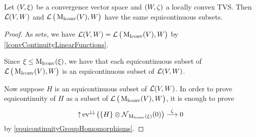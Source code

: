 \begin{proposition} \label{equicontinuousSetsLconvMod}
Let $\left( V,\xi \right)$ be a convergence vector space and $\left( W,\zeta \right)$ a locally convex TVS. Then $\operatorname{\mathcal{L}}(V,W)$ and $\operatorname{\mathcal{L}}\big(\operatorname{M_\text{lconv}}(V), W\big)$ have the same equicontinuous subsets.
\end{proposition}
\begin{proof}
As sets, we have $\operatorname{\mathcal{L}}(V,W) = \operatorname{\mathcal{L}}\big(\operatorname{M_\text{lconv}}(V), W\big)$ by \ref{lconvContinuityLinearFunctions}.

Since $\xi \leq \operatorname{M_\text{lconv}}(\xi)$, we have that each equicontinuous subset of $\operatorname{\mathcal{L}}\big(\operatorname{M_\text{lconv}}(V), W\big)$ is an equicontinuous subset of $\operatorname{\mathcal{L}}(V,W)$.

Now suppose $H$ is an equicontinuous subset of $\operatorname{\mathcal{L}}(V,W)$. 
In order to prove equicontinuity of $H$ as a subset of $\operatorname{\mathcal{L}}\big(\operatorname{M_\text{lconv}}(V), W\big)$, it is enough to prove
\[ \operatorname{\uparrow} \operatorname{ev}^{\downarrow\downarrow}\big(\{H\}\otimes \operatorname{\mathcal{N}}_{\operatorname{M_\text{lconv}}(\xi)}(0)\big) \overset{\zeta}{\longrightarrow} 0 \]
by \ref{equicontinuityGroupHomomorphisms}.


\end{proof}
